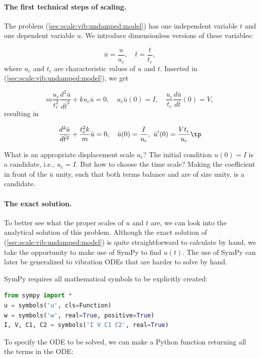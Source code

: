 \documentclass[graybox,envcountchap,sectrefs,final]{svmonodo}
\begin{document}
\paragraph{The first technical steps of scaling.}
The problem (\ref{sec:scale:vib:undamped:model}) has one independent
variable $t$ and one dependent variable $u$. We introduce dimensionless
versions of these variables:

\[ \bar u =\frac{u}{u_c},\quad\bar t = \frac{t}{t_c},\]
where $u_c$ and $t_c$ are characteristic values of $u$ and $t$.
Inserted in (\ref{sec:scale:vib:undamped:model}), we get

\[ m\frac{u_c}{t_c^2}\frac{d^2\bar u}{d\bar t^2} + ku_c\bar u = 0,
\quad u_c\bar u(0)=I,\quad \frac{u_c}{t_c}\frac{d\bar u}{d\bar t}(0)=V,\]
resulting in

\begin{equation}
\frac{d^2\bar u}{d\bar t^2} + \frac{t_c^2 k}{m}\bar u = 0,
\quad \bar u(0)=\frac{I}{u_c},\ \bar u'(0)=\frac{Vt_c}{u_c}\tp
\label{sec:scale:vib:undamped:model:scaled0}
\end{equation}

What is an appropriate displacement scale $u_c$? The initial condition
$u(0)=I$ is a candidate, i.e., $u_c=I$. But how to choose the time scale?
Making the coefficient in front of the $\bar u$ unity, such that
both terms balance and are of size unity, is a candidate.

\paragraph{The exact solution.}
To better see what the proper scales of $u$ and $t$ are, we can look
into the analytical solution of this problem.
Although the exact solution of
(\ref{sec:scale:vib:undamped:model}) is quite straightforward to calculate
by hand, we take the opportunity to make use of SymPy to
find $u(t)$. The use of SymPy can later be generalized to vibration
ODEs that are harder to solve by hand.

SymPy requires all mathematical symbols to be explicitly created:

\begin{lstlisting}[language=Python,style=graycolor]
from sympy import *
u = symbols('u', cls=Function)
w = symbols('w', real=True, positive=True)
I, V, C1, C2 = symbols('I V C1 C2', real=True)
\end{lstlisting}
To specify the ODE to be solved, we can make a Python function returning
all the terms in the ODE:
\end{document}
